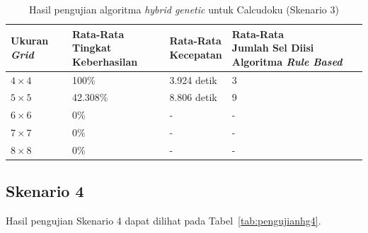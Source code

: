 \begin{table}
\centering
\captionsetup{justification=centering}
\caption[Hasil pengujian algoritma \textit{hybrid genetic} untuk Calcudoku (Skenario 3)]{Hasil pengujian algoritma \textit{hybrid genetic} untuk Calcudoku (Skenario 3)}
\begin{tabular}{| l | l | l | l |}
\hline
Ukuran \textit{Grid} & \makecell[c]{Rata-Rata \\ Tingkat Keberhasilan} & \makecell[c]{Rata-Rata \\ Kecepatan} & \makecell[c]{Rata-Rata \\ Jumlah Sel Diisi Algoritma \textit{Rule Based}} \\
\hline \hline
\begin{math}4 \times 4\end{math} & 100\% & 3.924 detik & 3 \\
\hline
\begin{math}5 \times 5\end{math} & 42.308\% & 8.806 detik & 9 \\
\hline
\begin{math}6 \times 6\end{math} & 0\% & - & - \\
\hline
\begin{math}7 \times 7\end{math} & 0\% & - & - \\
\hline
\begin{math}8 \times 8\end{math} & 0\% & - & - \\
\hline
\end{tabular}
\label{tab:pengujianhg3}
\end{table}

\subsection{Skenario 4}
\label{sec:skenario4}

Hasil pengujian Skenario 4 dapat dilihat pada Tabel~\ref{tab:pengujianhg4}.

